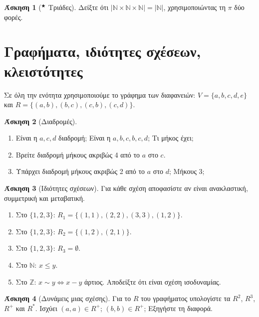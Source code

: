 \documentclass[11pt,a4paper]{article}
\theoremstyle{definition}
\newtheorem{question}{Άσκηση}
\newcommand{\N}{\mathbb{N}}
\newcommand{\Z}{\mathbb{Z}}
\newcommand{\st}{$^{\bigstar}$}  %
\newcommand{\gi}[1]{\item[(#1)]}
\begin{document}
\begin{question}[\st{} Τριάδες]
Δείξτε ότι $|\N\times\N\times\N|=|\N|$, χρησιμοποιώντας τη $\pi$ δύο φορές.
\end{question}


\section{Γραφήματα, ιδιότητες σχέσεων, κλειστότητες}

Σε όλη την ενότητα χρησιμοποιούμε το γράφημα των διαφανειών:
$V=\{a,b,c,d,e\}$ και $R=\{(a,b),(b,c),(c,b),(c,d)\}$.
\begin{center}
\end{center}

\begin{question}[Διαδρομές]
\begin{enumerate}[itemsep=0pt]
\gi{α} Είναι η $a,c,d$ διαδρομή; Είναι η $a,b,c,b,c,d$; Τι μήκος έχει;
\gi{β} Βρείτε διαδρομή μήκους ακριβώς 4 από το $a$ στο $c$.
\gi{γ} Υπάρχει διαδρομή μήκους ακριβώς 2 από το $a$ στο $d$; Μήκους 3;
\end{enumerate}
\end{question}


\begin{question}[Ιδιότητες σχέσεων]
Για κάθε σχέση αποφασίστε αν είναι ανακλαστική, συμμετρική και μεταβατική.
\begin{enumerate}[itemsep=0pt]
\gi{α} Στο $\{1,2,3\}$: $R_1=\{(1,1),(2,2),(3,3),(1,2)\}$.
\gi{β} Στο $\{1,2,3\}$: $R_2=\{(1,2),(2,1)\}$.
\gi{γ} Στο $\{1,2,3\}$: $R_3=\emptyset$.
\gi{δ} Στο $\N$: $x\le y$.
\gi{ε} Στο $\Z$: $x\sim y \iff x-y$ άρτιος. Αποδείξτε ότι είναι σχέση ισοδυναμίας.
\end{enumerate}
\end{question}


\begin{question}[Δυνάμεις μιας σχέσης]
Για το $R$ του γραφήματος υπολογίστε τα $R^2$, $R^3$, $R^+$ και $R^*$.
Ισχύει $(a,a)\in R^+$; $(b,b)\in R^+$; Εξηγήστε τη διαφορά.
\end{question}
\end{document}

